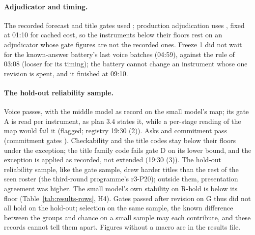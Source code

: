 \paragraph{Adjudicator and timing.} The recorded forecast and title gates used \ModelLargeGate; production adjudication
uses \ModelLarge, fixed at 01:10 for cached cost, so the instruments below their floors rest on an adjudicator whose
gate figures are not the recorded ones. Freeze 1 did not wait for the known-answer battery's last voice batches (04:59),
against the rule of 03:08 (looser for its timing); the battery cannot change an instrument whose one revision is spent,
and it finished at 09:10.

\paragraph{The hold-out reliability sample.} \ResRholdGates{} Voice passes, with the middle model as record on the small
model's map; its gate A is read per instrument, as plan 3.4 states it, while a per-stage reading of the map would fail
it (flagged; registry 19:30 (2)). Asks and commitment pass (commitment gates \ResRholdCommit). Checkability and the
title codes stay below their floors under the exception; the title family code fails gate D on its lower bound, and the
exception is applied as recorded, not extended (19:30 (3)). The hold-out reliability sample, like the gate sample,
drew harder titles than the rest of the seen roster (the third-round programme's r3-P20); outside them, presentation
agreement was higher. The small model's own stability on R-hold is below its floor
(Table~\ref{tab:results-rows}, H4). Gates passed after revision on G thus did not all hold on the hold-out; selection on
the same sample, the known difference between the groups and chance on a small sample may each contribute, and these
records cannot tell them apart. Figures without a macro are in the results file.

